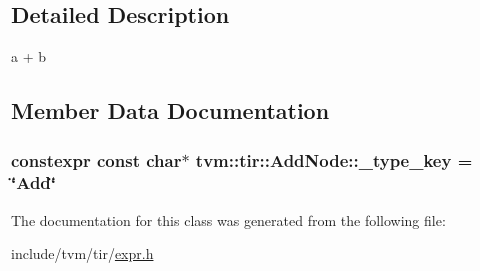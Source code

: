 \subsection{Detailed Description}
a + b 

\subsection{Member Data Documentation}
\subsubsection[{\texorpdfstring{\+\_\+type\+\_\+key}{_type_key}}]{\setlength{\rightskip}{0pt plus 5cm}constexpr const char$\ast$ tvm\+::tir\+::\+Add\+Node\+::\+\_\+type\+\_\+key = \char`\"{}Add\char`\"{}\hspace{0.3cm}{\ttfamily [static]}}\hypertarget{classtvm_1_1tir_1_1AddNode_acb112a802dbe7e838fa6c51680220844}{}\label{classtvm_1_1tir_1_1AddNode_acb112a802dbe7e838fa6c51680220844}


The documentation for this class was generated from the following file\+:\begin{DoxyCompactItemize}
\item 
include/tvm/tir/\hyperlink{tir_2expr_8h}{expr.\+h}\end{DoxyCompactItemize}
